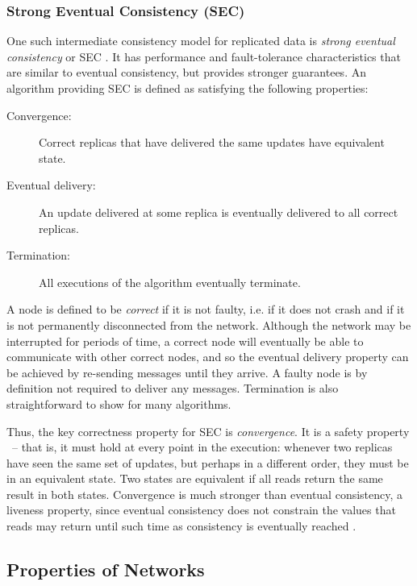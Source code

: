 \subsubsection{Strong Eventual Consistency (SEC)}

One such intermediate consistency model for replicated data is \emph{strong eventual consistency} or
SEC \cite{Shapiro:2011un}. It has performance and fault-tolerance characteristics that are similar
to eventual consistency, but provides stronger guarantees. An algorithm providing SEC is defined as
satisfying the following properties:

\begin{description}
\item[Convergence:] Correct replicas that have delivered the same updates have equivalent state.
\item[Eventual delivery:] An update delivered at some replica is eventually delivered to all correct
replicas.
\item[Termination:] All executions of the algorithm eventually terminate.
\end{description}

A node is defined to be \emph{correct} if it is not faulty, i.e. if it does not crash and if it is
not permanently disconnected from the network. Although the network may be interrupted for periods
of time, a correct node will eventually be able to communicate with other correct nodes, and so the
eventual delivery property can be achieved by re-sending messages until they arrive. A faulty node
is by definition not required to deliver any messages. Termination is also straightforward to show
for many algorithms.

Thus, the key correctness property for SEC is \emph{convergence}. It is a safety property
\cite{Alpern:1985dg}~-- that is, it must hold at every point in the execution: whenever two replicas
have seen the same set of updates, but perhaps in a different order, they must be in an equivalent
state. Two states are equivalent if all reads return the same result in both states. Convergence is
much stronger than eventual consistency, a liveness property, since eventual consistency does not
constrain the values that reads may return until such time as consistency is eventually reached
\cite{Bailis:2013jc}.

\subsection{Properties of Networks}

